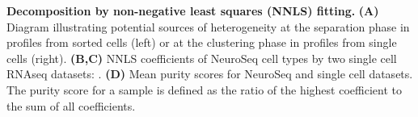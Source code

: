 \textbf{Decomposition by non-negative least squares (NNLS) fitting.}
\textbf{(A)} Diagram illustrating potential sources of heterogeneity at the separation phase in profiles from sorted cells (left) or at the clustering phase in profiles from single cells (right).
\textbf{(B,C)} NNLS coefficients of NeuroSeq cell types by two single cell RNAseq datasets: \citep{Tasic_2018,Zeisel_2018}.
\textbf{(D)} Mean purity scores for NeuroSeq and single cell datasets. The purity score for a sample is defined as the ratio of the highest coefficient to the sum of all coefficients. 